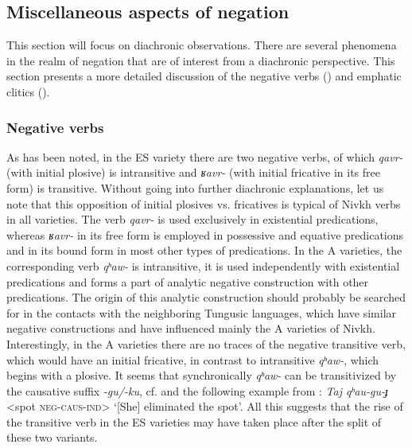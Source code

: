 \documentclass[output=paper,colorlinks,citecolor=brown]{langscibook}
\begin{document}
\subsection{Miscellaneous aspects of negation}\label{sec:niv:4.6} 
This section will focus on diachronic observations.
There are several phenomena in the realm of negation that are of interest from a diachronic perspective. This section presents a more detailed discussion of the negative verbs () and emphatic clitics ().

\subsubsection{Negative verbs}\label{sec:niv:4.6.1} 

As has been noted, in the ES variety there are two negative verbs, of which \textit{qavr-} (with initial plosive) is intransitive and \textit{ʁavr-} (with initial fricative in its free form) is transitive. Without going into further diachronic explanations, let us note that this opposition of initial plosives vs. fricatives is typical of Nivkh verbs in all varieties. The verb \textit{qavr-} is used exclusively in existential predications, whereas \textit{ʁavr-} in its free form is employed in possessive and equative predications and in its bound form in most other types of predications. In the A varieties, the corresponding verb \textit{qʰaw-} is intransitive, it is used independently with existential predications and forms a part of analytic negative construction with other predications. The origin of this analytic construction should probably be searched for in the contacts with the neighboring Tungusic languages, which have similar negative constructions and have influenced mainly the A varieties of Nivkh. Interestingly, in the A varieties there are no traces of the negative transitive verb, which would have an initial fricative, in contrast to intransitive \textit{qʰaw-}, which begins with a plosive. It seems that synchronically \textit{qʰaw-} can be transitivized by the causative suffix \textit{-gu/-ku}, cf.  and the following example from \citet[148]{SaveljevaTaksami1970}: \textit{Taj qʰau-gu-ɟ} <spot \textsc{neg-caus-ind}> ‘[She] eliminated the spot’. All this suggests that the rise of the transitive verb in the ES varieties may have taken place after the split of these two variants.
\end{document}
